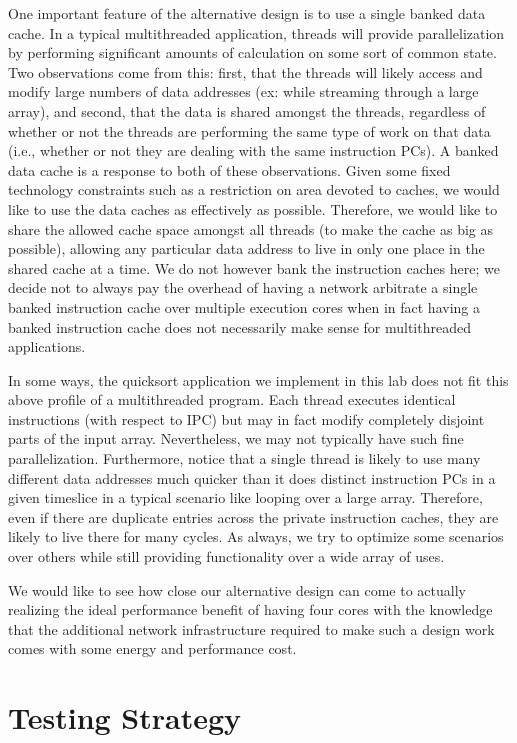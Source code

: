 \documentclass[10pt]{article}
\begin{document}
One important feature of the alternative design is to use a single banked data cache. In a typical multithreaded application, threads will provide parallelization by performing significant amounts of calculation on some sort of common state. Two observations come from this: first, that the threads will likely access and modify large numbers of data addresses (ex: while streaming through a large array), and second, that the data is shared amongst the threads, regardless of whether or not the threads are performing the same type of work on that data (i.e., whether or not they are dealing with the same instruction PCs). A banked data cache is a response to both of these observations. Given some fixed technology constraints such as a restriction on area devoted to caches, we would like to use the data caches as effectively as possible. Therefore, we would like to share the allowed cache space amongst all threads (to make the cache as big as possible), allowing any particular data address to live in only one place in the shared cache at a time. We do not however bank the instruction caches here; we decide not to always pay the overhead of having a network arbitrate a single banked instruction cache over multiple execution cores when in fact having a banked instruction cache does not necessarily make sense for multithreaded applications.

In some ways, the quicksort application we implement in this lab does not fit this above profile of a multithreaded program. Each thread executes identical instructions (with respect to IPC) but may in fact modify completely disjoint parts of the input array. Nevertheless, we may not typically have such fine parallelization. Furthermore, notice that a single thread is likely to use many different data addresses much quicker than it does distinct instruction PCs in a given timeslice in a typical scenario like looping over a large array. Therefore, even if there are duplicate entries across the private instruction caches, they are likely to live there for many cycles. As always, we try to optimize some scenarios over others while still providing functionality over a wide array of uses.

We would like to see how close our alternative design can come to actually realizing the ideal performance benefit of having four cores with the knowledge that the additional network infrastructure required to make such a design work comes with some energy and performance cost.


\section{Testing Strategy}
\end{document}
